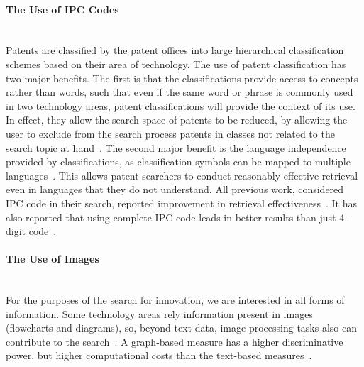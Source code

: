 \paragraph{The Use of IPC Codes}
\ \\
Patents are classified by the patent offices into large hierarchical classification schemes based on their area of technology. The use of patent
classification has two major benefits. The first is that the classifications provide access to concepts rather than words, such that even
if the same word or phrase is commonly used in two technology areas, patent classifications will provide the context of its use. In effect, they
allow the search space of patents to be reduced, by allowing the user to exclude from the search process patents in classes not related to
the search topic at hand~\citep{lopez2010patatras}. The second major benefit is the language independence provided by classifications, as classification symbols can be mapped to multiple languages~\citep{DBLP:conf/clef/DhondtV10}. This allows patent searchers to conduct reasonably effective retrieval even in languages that they do not understand. All previous work, considered IPC code in their search, reported improvement in retrieval effectiveness~\citep{harris2010comparison, harris2011using, harris2009role, fujita2005revisiting, graf2010knowledge, herbert2010prior, kang2007cluster, verma2011applying}. It has also reported that using complete IPC code leads in better results than just 4-digit code~\citep{ gobeill2010simple}.
\paragraph{The Use of Images}
\ \\
For the purposes of the search for innovation, we are interested in all forms of information. Some technology areas rely information present in images (flowcharts and diagrams), so, beyond text data, image processing tasks also can contribute to the search~\citep{lupu2013patent}. A graph-based measure has a higher discriminative power, but higher computational costs than the text-based measures~\citep{lupu2013evaluating}.
